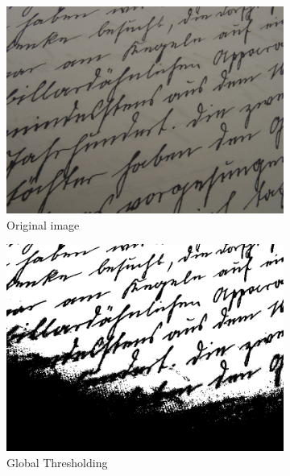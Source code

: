 \begin{figure}[H]
    \centering
    \begin{subfigure}{0.33\textwidth}
        \centering
        \includegraphics[width=.99\linewidth]{images/literature/thresholding/original_text}
        \caption{Original image\cite{website:handwriting_image}}
    \end{subfigure}%
    \begin{subfigure}{.33\textwidth}
        \centering
        \includegraphics[width=.99\linewidth]{images/literature/thresholding/text_global_thresholding}
        \caption{Global Thresholding}
    \end{subfigure}%
    \begin{subfigure}{.33\textwidth}

\end{subfigure}
\end{figure}

